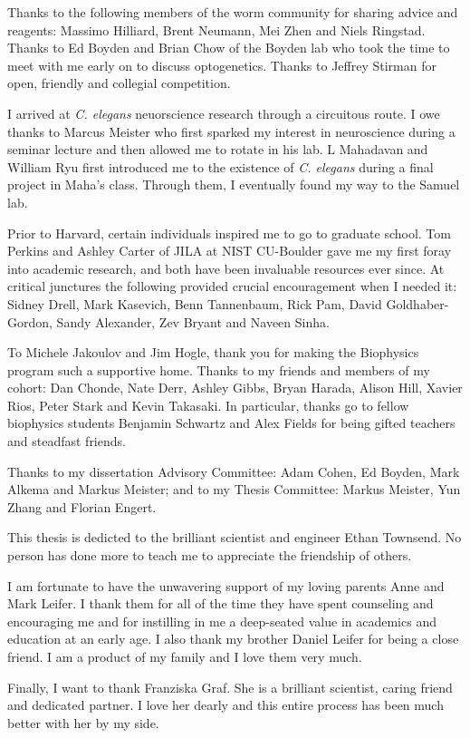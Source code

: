 Thanks to the following members of the worm community for sharing advice and reagents: Massimo Hilliard,  Brent Neumann, Mei Zhen  and Niels Ringstad. Thanks to
Ed Boyden and Brian Chow of the Boyden lab who took the time to meet with me early on to discuss optogenetics. Thanks to Jeffrey Stirman for open, friendly and collegial competition. 
 
I arrived at \textit{C. elegans} neuorscience research through a circuitous route. I owe thanks to Marcus Meister who first sparked my interest in neuroscience during a seminar lecture and then allowed me to rotate in his lab. L Mahadavan and William Ryu first introduced me to the existence of \textit{C. elegans} during a final project in Maha's class. Through them, I eventually  found my way to the Samuel lab. 

Prior to Harvard, certain individuals inspired me to go to graduate school. Tom Perkins and Ashley Carter of JILA at NIST CU-Boulder gave me my first foray into academic research, and both have been invaluable resources ever since. At critical junctures the following provided crucial encouragement when I needed it: Sidney Drell, Mark Kasevich, Benn Tannenbaum, Rick Pam, David Goldhaber-Gordon, Sandy Alexander, Zev Bryant and Naveen Sinha.

To Michele Jakoulov and Jim Hogle, thank you for making the Biophysics program such a supportive home. Thanks to my friends and members of my cohort: Dan Chonde, Nate Derr, Ashley Gibbs, Bryan Harada, Alison Hill, Xavier Rios, Peter Stark  and Kevin Takasaki. In particular, thanks go to fellow biophysics students Benjamin Schwartz and Alex Fields for being gifted teachers and steadfast friends.

Thanks to my dissertation Advisory Committee: Adam Cohen, Ed Boyden, Mark Alkema and Markus Meister; and to my Thesis Committee: Markus Meister, Yun Zhang and Florian Engert.

This thesis is dedicted to the brilliant scientist and engineer Ethan Townsend.
No person has done more to  teach me to appreciate the friendship of others.

I am fortunate to have the unwavering support of my loving parents Anne and Mark Leifer. I thank them for all of the time they have spent counseling and encouraging me and for instilling in me a deep-seated value in academics and education at an early age. I also thank my brother Daniel Leifer for being a close friend. I am a product of my family and I love them very much.

Finally, I want to thank Franziska Graf. She is a brilliant scientist, caring friend and dedicated partner. I love her dearly and this entire process has been much better with her by my side.



